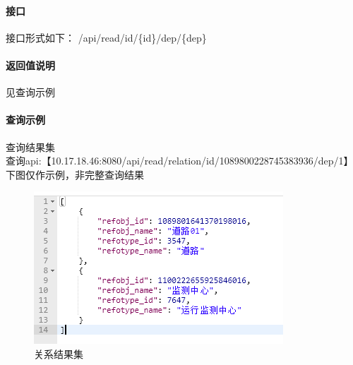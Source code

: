 \documentclass[UTF8, 12pt]{ctexart}
\begin{document}
	\paragraph{接口}
		接口形式如下：
		\newline
		{\color{red}/api/read/id/\{id\}/dep/\{dep\}}
	\paragraph{返回值说明}
		见查询示例

	\paragraph{查询示例}
		查询结果集 \\
		查询api:【10.17.18.46:8080/api/read/relation/id/1089800228745383936/dep/1】 \\
		下图仅作示例，非完整查询结果 \\
		\begin{figure}[H]
			\centering
			\includegraphics[width = 0.7\linewidth]{relation.png}
			\caption{关系结果集}
			\label{Fig:2}
			\vspace{-0.5cm}
		\end{figure}
\end{document}
